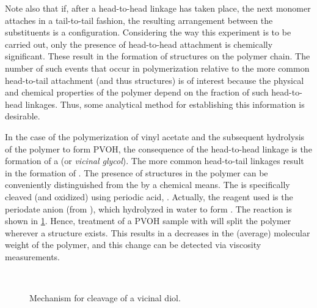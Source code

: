 \documentclass[nobib,nofonts,nols,nohyper]{tufte-handout}
\begin{document}
Note also that if, after a head-to-head linkage has taken place, the next monomer attaches in a tail-to-tail fashion, the resulting arrangement between the substituents is a  configuration. 
Considering the way this experiment is to be carried out, only the presence of head-to-head attachment is chemically significant. 
These result in the formation of  structures on the polymer chain. The number of such events that occur in polymerization relative to the more common head-to-tail attachment (and thus  structures) is of interest because the physical and chemical properties of the polymer depend on the fraction of such head-to-head linkages. 
Thus, some analytical method for establishing this information is desirable. 

In the case of the polymerization of vinyl acetate and the subsequent hydrolysis of the polymer to form PVOH, the consequence of the head-to-head linkage is the formation of a  (or \emph{vicinal glycol}). 
The more common head-to-tail linkages result in the formation of . 
The presence of  structures in the polymer can be conveniently distinguished from the  by a chemical means. 
The  is specifically cleaved (and oxidized) using periodic acid, . 
Actually, the reagent used is the periodate anion (from ), which hydrolyzed in water to form .
The reaction is shown in \cref{fig:diol_cleavage}. 
Hence, treatment of a PVOH sample with  will split the polymer wherever a  structure exists. 
This results in a decreases in the (average) molecular weight of the polymer, and this change can be detected via viscosity measurements. 
\begin{figure}[htb]
	 \\
	\caption{Mechanism for cleavage of a vicinal diol.}
	\label{fig:diol_cleavage}
\end{figure}
\end{document}

